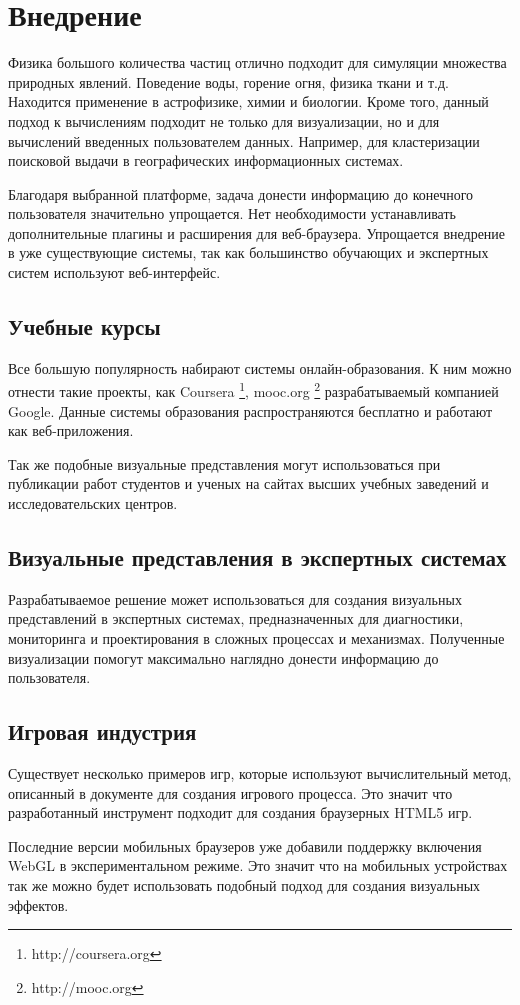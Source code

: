 \newpage

\section{Внедрение} %

Физика большого количества частиц отлично подходит для симуляции множества
природных явлений. Поведение воды, горение огня, физика ткани и т.д.
Находится применение в астрофизике, химии и биологии. Кроме того,
данный подход к вычислениям подходит не только для визуализации, но 
и для вычислений введенных пользователем данных. Например, для кластеризации 
поисковой выдачи в географических информационных системах.

Благодаря выбранной платформе, задача донести информацию до конечного пользователя
значительно упрощается. Нет необходимости устанавливать дополнительные плагины
и расширения для веб-браузера. Упрощается внедрение в уже существующие системы, 
так как большинство обучающих и экспертных систем используют веб-интерфейс.

\subsection{Учебные курсы}

Все большую популярность набирают системы онлайн-образования. К ним можно
отнести такие проекты, как Coursera \footnote{http://coursera.org}, mooc.org \footnote{http://mooc.org}
разрабатываемый компанией Google. Данные системы образования распространяются бесплатно 
и работают как веб-приложения.

Так же подобные визуальные представления могут использоваться при публикации работ студентов 
и ученых на сайтах высших учебных заведений и исследовательских центров.

\subsection{Визуальные представления в экспертных системах}

Разрабатываемое решение может использоваться для создания визуальных представлений
в экспертных системах, предназначенных для диагностики, мониторинга и проектирования
в сложных процессах и механизмах. Полученные визуализации помогут максимально наглядно
донести информацию до пользователя.

\subsection{Игровая индустрия}

Существует несколько примеров игр, которые используют вычислительный метод, описанный 
в документе для создания игрового процесса. Это значит что разработанный инструмент
подходит для создания браузерных HTML5 игр.

Последние версии мобильных браузеров уже добавили поддержку включения WebGL в
экспериментальном режиме. Это значит что на мобильных устройствах так же можно будет
использовать подобный подход для создания визуальных эффектов.
